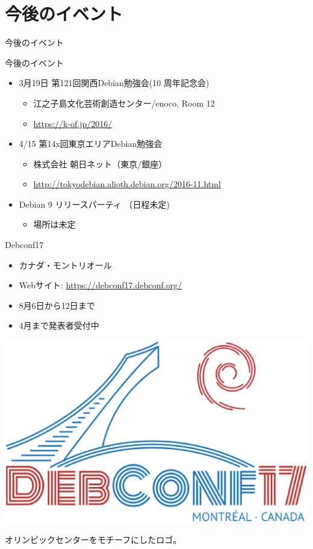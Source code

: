 \section{今後のイベント}
\begin{frame}\begin{center}\Huge{今後のイベント}\end{center}\end{frame}

\begin{frame}{今後のイベント}
\begin{itemize}

\item 3月19日 第121回関西Debian勉強会(10 周年記念会)
  \begin{itemize}
      \item 江之子島文化芸術創造センター/enoco, Room 12 
      \item \url{https://k-of.jp/2016/}
  \end{itemize}
\item 4/15 第14x回東京エリアDebian勉強会
  \begin{itemize}
      \item 株式会社 朝日ネット（東京/銀座）
      \item \url{http://tokyodebian.alioth.debian.org/2016-11.html}
  \end{itemize}
\item  Debian 9 リリースパーティ （日程未定)
  \begin{itemize}
      \item 場所は未定
  \end{itemize}
\end{itemize}
\end{frame}

\begin{frame}{Debconf17}
  \begin{itemize}
      \item カナダ・モントリオール
      \item Webサイト: \url{https://debconf17.debconf.org/}
      \item 8月6日から12日まで
      \item 4月まで発表者受付中
  \end{itemize}

\begin{center}
\includegraphics[width=0.8\hsize]{image201703/debconf17-logo.eps}
\end{center}

オリンピックセンターをモチーフにしたロゴ。

\end{frame}

